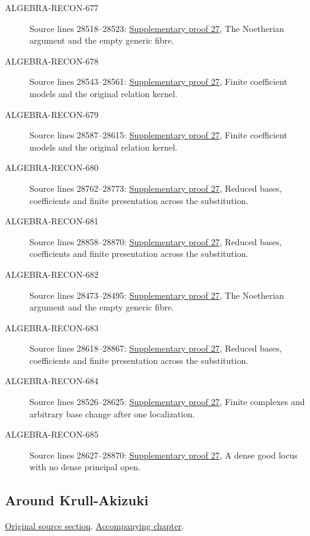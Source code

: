 \begin{description}
\item[ALGEBRA-RECON-677] Source lines 28518--28523: \hyperlink{algebra_generic_freeness_notes_20260928}{Supplementary proof 27}, The Noetherian argument and the empty generic fibre.
\item[ALGEBRA-RECON-678] Source lines 28543--28561: \hyperlink{algebra_generic_freeness_notes_20260928}{Supplementary proof 27}, Finite coefficient models and the original relation kernel.
\item[ALGEBRA-RECON-679] Source lines 28587--28615: \hyperlink{algebra_generic_freeness_notes_20260928}{Supplementary proof 27}, Finite coefficient models and the original relation kernel.
\item[ALGEBRA-RECON-680] Source lines 28762--28773: \hyperlink{algebra_generic_freeness_notes_20260928}{Supplementary proof 27}, Reduced bases, coefficients and finite presentation across the substitution.
\item[ALGEBRA-RECON-681] Source lines 28858--28870: \hyperlink{algebra_generic_freeness_notes_20260928}{Supplementary proof 27}, Reduced bases, coefficients and finite presentation across the substitution.
\item[ALGEBRA-RECON-682] Source lines 28473--28495: \hyperlink{algebra_generic_freeness_notes_20260928}{Supplementary proof 27}, The Noetherian argument and the empty generic fibre.
\item[ALGEBRA-RECON-683] Source lines 28618--28867: \hyperlink{algebra_generic_freeness_notes_20260928}{Supplementary proof 27}, Reduced bases, coefficients and finite presentation across the substitution.
\item[ALGEBRA-RECON-684] Source lines 28526--28625: \hyperlink{algebra_generic_freeness_notes_20260928}{Supplementary proof 27}, Finite complexes and arbitrary base change after one localization.
\item[ALGEBRA-RECON-685] Source lines 28627--28870: \hyperlink{algebra_generic_freeness_notes_20260928}{Supplementary proof 27}, A dense good locus with no dense principal open.
\end{description}

\subsection{Around Krull-Akizuki}
\hypertarget{algebra-source-section-krull-akizuki}{}
\noindent\href{https://github.com/stacks/stacks-project/blob/a04446e57ec1fbc252a871afcec7752fb2807b14/algebra.tex\#L28877}{Original source section}. \href{algebra.pdf\#nameddest=section-krull-akizuki}{Accompanying chapter}.

